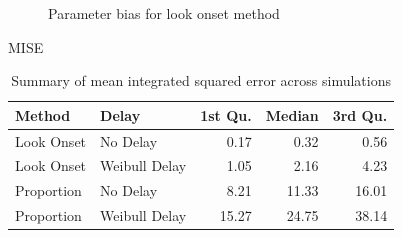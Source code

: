\documentclass{beamer}
\begin{document}
\begin{frame}
\begin{figure}[H]
\centering
\caption{Parameter bias for look onset method}
\label{fig:par_bias_no_delay}
\end{figure}
\end{frame}

\begin{frame}{MISE}

\begin{table}[H]
\centering
\begin{tabular}{llrrr}
  \hline
Method & Delay & 1st Qu. & Median & 3rd Qu. \\ 
  \hline
Look Onset & No Delay & 0.17 & 0.32 & 0.56 \\ 
  Look Onset & Weibull Delay & 1.05 & 2.16 & 4.23 \\ 
  Proportion & No Delay & 8.21 & 11.33 & 16.01 \\ 
  Proportion & Weibull Delay & 15.27 & 24.75 & 38.14 \\ 
   \hline
\end{tabular}
\caption{Summary of mean integrated squared error across simulations}
\label{tab:mise_sims}
\end{table}

\end{frame}
\end{document}
